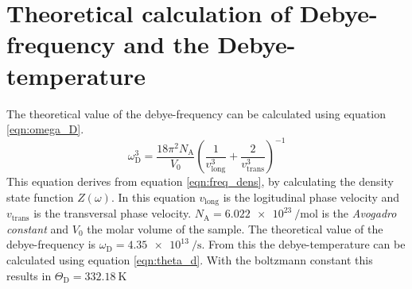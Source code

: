 \section{Theoretical calculation of Debye-frequency and the Debye-temperature}
\label{sec:theo}
The theoretical value of the debye-frequency can be calculated using equation \ref{eqn:omega_D}. 
\begin{equation}
    \label{eqn:omega_D}
    \omega_\mathrm{D}^3 = \frac{18\pi^2N_\mathrm{A}}{V_0}\left(\frac{1}{v_{\mathrm{long}}^3}+\frac{2}{v_{\mathrm{trans}}^3}\right)^{-1}
\end{equation}
This equation derives from equation \ref{eqn:freq_dens}, by calculating the density state function $Z(\omega)$. In this equation $v_{\mathrm{long}}$ is the logitudinal phase velocity and
$v_{\mathrm{trans}}$ is the transversal phase velocity\cite{v47}. $N_\mathrm{A} = \qty{6.022e23}{\per\mol}$ is the \textit{Avogadro constant} and $V_0$ the molar volume of the sample.
The theoretical value of the debye-frequency is $\omega_\mathrm{D} = \qty{4.35e13}{\per\second}$. From this the debye-temperature can be calculated using equation \ref{eqn:theta_d}.
With the boltzmann constant this results in $\Theta_\mathrm{D} = \qty{332.18}{\kelvin}$

  